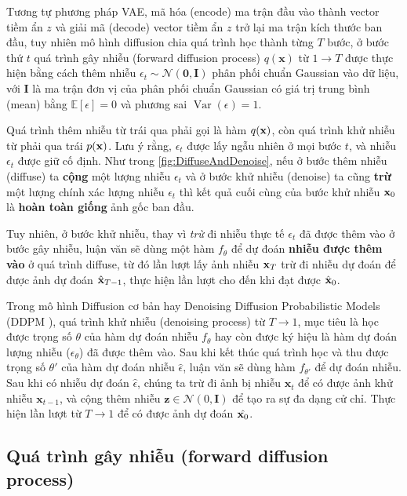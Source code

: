 Tương tự phương pháp VAE, mã hóa (encode) ma trận đầu vào thành vector tiềm ẩn $z$ và giải mã (decode) vector tiềm ẩn $z$ trở lại ma trận kích thước ban đầu, tuy nhiên mô hình diffusion chia quá trình học thành từng $T$ bước, ở bước thứ $t$ quá trình gây nhiễu (forward diffusion process) $q(\mathbf{x})$ từ $1 \to T$ được thực hiện bằng cách thêm nhiễu $\epsilon_{t} \sim \mathcal{N} (\mathbf{0}, \mathbf{I})$ phân phối chuẩn Gaussian vào dữ liệu, với $\mathbf{I}$ là ma trận đơn vị của phân phối chuẩn Gaussian có giá trị trung bình  (mean) bằng $\mathbb{E}[\epsilon]=0$ và phương sai $\operatorname{Var}(\epsilon)=1$.


Quá trình thêm nhiễu từ trái qua phải gọi là hàm $q(\mathbf{x})$, còn quá trình khử nhiễu từ phải qua trái $p(\mathbf{x})$. Lưu ý rằng, $\epsilon_t$ được lấy ngẫu nhiên ở mọi bước $t$, và nhiễu $\epsilon_t$ được giữ cố định. Như trong \autoref{fig:DiffuseAndDenoise}, nếu ở bước thêm nhiễu (diffuse) ta \textbf{cộng} một lượng nhiễu $\epsilon_t$ và ở bước khử nhiễu (denoise) ta cũng \textbf{trừ} một lượng chính xác lượng nhiễu $\epsilon_t$ thì kết quả cuối cùng của bước khử nhiễu $\mathbf{x}_0$ là \textbf{hoàn toàn giống} ảnh gốc ban đầu.

Tuy nhiên, ở bước khử nhiễu, thay vì \textit{trừ} đi nhiễu thực tế $\epsilon_t$ đã được thêm vào ở bước gây nhiễu, luận văn sẽ dùng một hàm $f_{\theta}$ để dự đoán \textbf{nhiễu được thêm vào} ở quá trình diffuse, từ đó lần lượt lấy ảnh nhiễu $\mathbf{x}_T$ trừ đi nhiễu dự đoán để được ảnh dự đoán $\hat{\mathbf{x}}_{T-1}$, thực hiện lần lượt cho đến khi đạt được $\hat{\mathbf{x}}_0$.

Trong mô hình Diffusion cơ bản hay Denoising Diffusion Probabilistic Models (DDPM \cite{ho2020denoising}), quá trình khử nhiễu (denoising process) từ $T \to 1$, mục tiêu là học được trọng số $\theta$ của hàm dự đoán nhiễu $f_{\theta}$ hay còn được ký hiệu là hàm dự đoán lượng nhiễu ($\epsilon_\theta$) đã được thêm vào. Sau khi kết thúc quá trình học và thu được trọng số $\theta'$ của hàm dự đoán nhiễu $\hat{\epsilon}$, luận văn sẽ dùng hàm $f_{\theta'}$ để dự đoán nhiễu. Sau khi có nhiễu dự đoán $\hat{\epsilon}$, chúng ta trừ đi ảnh bị nhiễu $\mathbf{x}_{t}$ để có được ảnh khử nhiễu $\mathbf{x}_{t-1}$, và cộng thêm nhiễu $ \mathbf{z} \in \mathcal{N}(0, \mathbf{I})$ để tạo ra sự đa dạng cử chỉ. Thực hiện lần lượt từ $T \to 1$ để có được ảnh dự đoán $\hat{\mathbf{x}_0}$.

\subsection{Quá trình gây nhiễu (forward diffusion process)}

